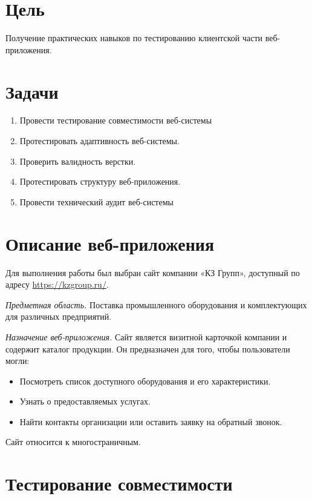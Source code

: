 \section*{Цель}
Получение практических навыков по тестированию клиентской части веб-приложения.

\section*{Задачи}
\begin{enumerate}
    \item Провести тестирование совместимости веб-системы
    \item Протестировать адаптивность веб-системы.
    \item Проверить валидность верстки.
    \item Протестировать структуру веб-приложения.
    \item Провести технический аудит веб-системы
\end{enumerate}

\section*{Описание веб-приложения}
Для выполнения работы был выбран сайт компании «КЗ Групп», доступный по адресу \url{https://kzgroup.ru/}.

\textit{Предметная область.} Поставка промышленного оборудования и комплектующих для различных предприятий.

\textit{Назначение веб-приложения.} Сайт является визитной карточкой компании и содержит каталог продукции. Он предназначен для того, чтобы пользователи могли:
\begin{itemize}
\item Посмотреть список доступного оборудования и его характеристики.
\item Узнать о предоставляемых услугах.
\item Найти контакты организации или оставить заявку на обратный звонок.
\end{itemize}

Сайт относится к многостраничным.

\newpage
\section{Тестирование совместимости}

